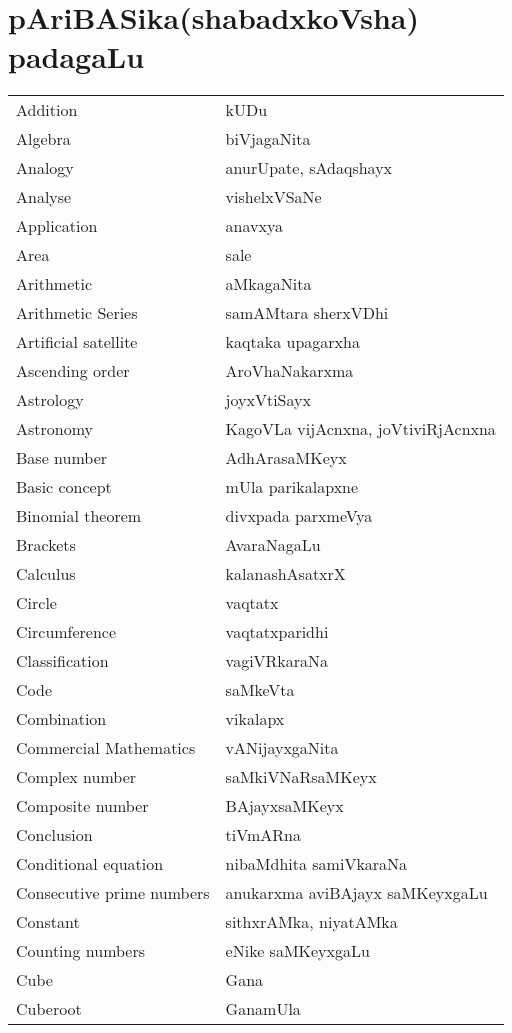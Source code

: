 \chapter{pAriBASika(shabadxkoVsha) padagaLu}

\begin{longtable}{>{\rm}l@{\hspace{1cm}}l}
Addition & kUDu\\
Algebra & biVjagaNita\\
Analogy & anurUpate, sAdaqshayx\\
Analyse & vishelxVSaNe\\
Application & anavxya\\
Area & sale\\
Arithmetic & aMkagaNita\\
Arithmetic Series & samAMtara sherxVDhi\\
Artificial satellite & kaqtaka upagarxha\\
Ascending order & AroVhaNakarxma\\
Astrology & joyxVtiSayx\\
Astronomy & KagoVLa vijAcnxna, joVtiviRjAcnxna\\
Base number & AdhArasaMKeyx\\
Basic concept & mUla parikalapxne\\
Binomial theorem & divxpada parxmeVya\\
Brackets &  AvaraNagaLu\\
Calculus & kalanashAsatxrX\\
Circle & vaqtatx\\
Circumference & vaqtatxparidhi\\
Classification & vagiVRkaraNa\\
Code & saMkeVta\\
Combination & vikalapx\\
Commercial Mathematics & vANijayxgaNita\\
Complex number & saMkiVNaRsaMKeyx\\
Composite number & BAjayxsaMKeyx\\
Conclusion & tiVmARna\\
Conditional equation & nibaMdhita samiVkaraNa\\
Consecutive prime numbers & anukarxma aviBAjayx saMKeyxgaLu\\
Constant & sithxrAMka, niyatAMka\\
Counting numbers & eNike saMKeyxgaLu\\
Cube & Gana\\
Cuberoot & GanamUla\\

\end{longtable}
